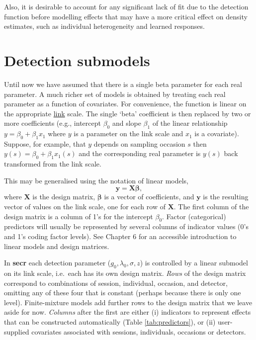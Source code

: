 \documentclass[
]{book}
\begin{document}
Also, it is desirable to account for any significant lack of fit due to the detection function before modelling effects that may have a more critical effect on density estimates, such as individual heterogeneity and learned responses.

\section{Detection submodels}\label{linear-submodels}


Until now we have assumed that there is a single beta parameter for each real parameter. A much richer set of models is obtained by treating each real parameter as a function of covariates. For convenience, the function is linear on the appropriate \hyperref[link]{link} scale. The single `beta' coefficient is then replaced by two or more coefficients (e.g., intercept \(\beta_0\) and slope \(\beta_1\) of the linear relationship \(y = \beta_0 + \beta_1x_1\) where \(y\) is a parameter on the link scale and \(x_1\) is a covariate). Suppose, for example, that \(y\) depends on sampling occasion \(s\) then \(y(s) = \beta_0 + \beta_1x_1(s)\) and the corresponding real parameter is \(y(s)\) back transformed from the link scale.

This may be generalised using the notation of linear models,
\begin{equation}
\mathbf{y} = \mathbf{X} \pmb {\beta},
\label{eq:linearmodel}
\end{equation}
where \(\mathbf{X}\) is the design matrix,
\(\pmb{\beta}\) is a vector of coefficients, and \(\mathbf{y}\) is the resulting vector of values on the link scale, one for each row of \(\mathbf{X}\). The first column of the design matrix is a column of 1's for the intercept \(\beta_0\). Factor (categorical) predictors will usually be represented by several columns of indicator values (0's and 1's coding factor levels). See \citet{cw} Chapter 6 for an accessible introduction to linear models and design matrices.

In \textbf{secr} each detection parameter (\(g_0, \lambda_0, \sigma, z\)) is controlled by a linear submodel on its link scale, i.e.~each has its own design matrix. \emph{Rows} of the design matrix correspond to combinations of session, individual, occasion, and detector, omitting any of these four that is constant (perhaps because there is only one level). Finite-mixture models add further rows to the design matrix that we leave aside for now. \emph{Columns} after the first are either (i) indicators to represent effects that can be constructed automatically (Table \ref{tab:predictors}), or (ii) user-supplied covariates associated with sessions, individuals, occasions or detectors.
\end{document}
